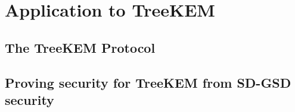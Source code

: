 \chapter{Application to TreeKEM} \label{sec:application-to-treekem}

\section{The TreeKEM Protocol}


\section{Proving security for TreeKEM from SD-GSD security}


